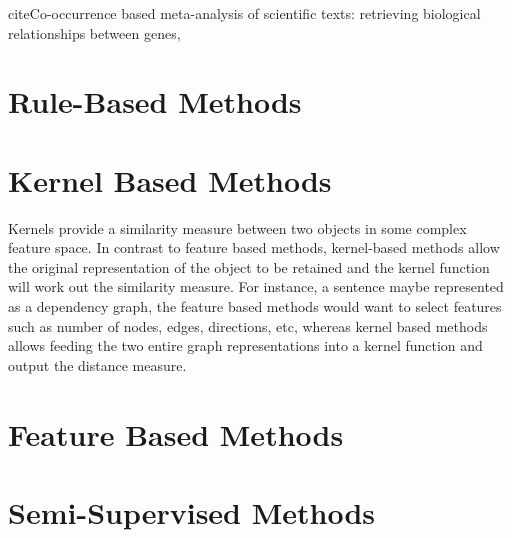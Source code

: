 cite{Co-occurrence based meta-analysis of scientific texts:
	retrieving biological relationships between genes}, 
\section{Rule-Based Methods}

\section{Kernel Based Methods} 
Kernels provide a similarity measure between two objects in some complex feature space. In contrast to feature based methods, kernel-based methods allow the original representation of the object to be retained and the kernel function will work out the similarity measure. For instance, a sentence maybe represented as a dependency graph, the feature based methods would want to select features such as number of nodes, edges, directions, etc, whereas kernel based methods allows feeding the two entire graph representations into a kernel function and output the distance measure.

\section{Feature Based Methods}  %
\label{section1.3}

\section{Semi-Supervised Methods}